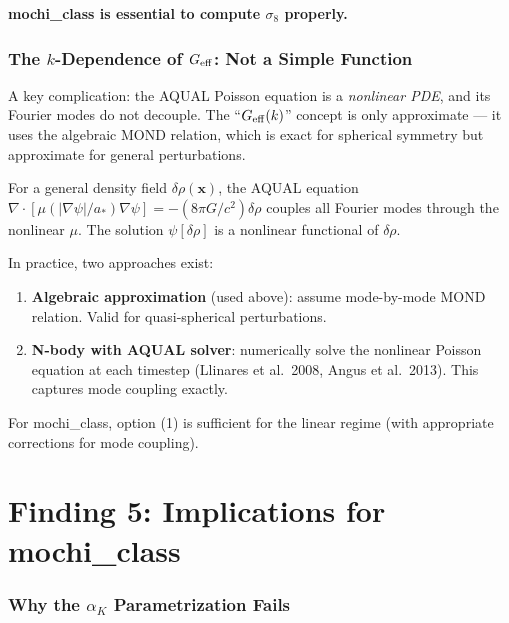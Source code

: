 \documentclass[11pt]{article}
\newcommand{\Geff}{G_{\rm eff}}
\newcommand{\astar}{a_*}
\begin{document}
\textbf{mochi\_class is essential to compute $\sigma_8$ properly.}

\section{The $k$-Dependence of $\Geff$: Not a Simple Function}

A key complication: the AQUAL Poisson equation is a \emph{nonlinear
PDE}, and its Fourier modes do not decouple. The ``$\Geff(k)$''
concept is only approximate --- it uses the algebraic MOND relation,
which is exact for spherical symmetry but approximate for general
perturbations.

For a general density field $\delta\rho(\mathbf{x})$, the AQUAL
equation $\nabla\cdot[\mu(|\nabla\psi|/\astar)\nabla\psi]
= -(8\pi G/c^2)\delta\rho$ couples all Fourier modes through
the nonlinear $\mu$. The solution $\psi[\delta\rho]$ is a
nonlinear functional of $\delta\rho$.

In practice, two approaches exist:
\begin{enumerate}
\item \textbf{Algebraic approximation} (used above): assume mode-by-mode
  MOND relation. Valid for quasi-spherical perturbations.
\item \textbf{N-body with AQUAL solver}: numerically solve the nonlinear
  Poisson equation at each timestep (Llinares et al.\ 2008,
  Angus et al.\ 2013). This captures mode coupling exactly.
\end{enumerate}

For mochi\_class, option (1) is sufficient for the linear regime
(with appropriate corrections for mode coupling).


\part{Finding 5: Implications for mochi\_class}
\label{part:mochi}

\section{Why the $\alpha_K$ Parametrization Fails}
\end{document}
